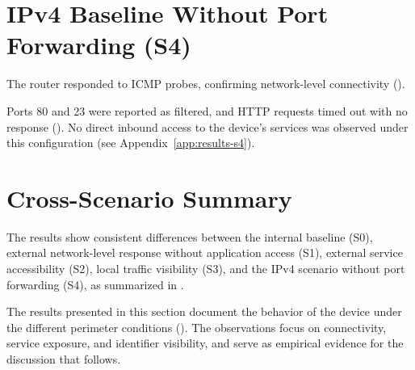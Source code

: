 \section{IPv4 Baseline Without Port Forwarding (S4)}\label{sec:results-s4}
The router responded to ICMP probes, confirming network-level connectivity ().

Ports 80 and 23 were reported as filtered, and HTTP requests timed out with no response (). No direct inbound access to the device’s services was observed under this configuration (see Appendix~\ref{app:results-s4}).

\section{Cross-Scenario Summary}\label{sec:results-summary}
The results show consistent differences between the internal baseline (S0), external network-level response without application access (S1), external service accessibility (S2), local traffic visibility (S3), and the IPv4 scenario without port forwarding (S4), as summarized in .

The results presented in this section document the behavior of the device under the different perimeter conditions (). The observations focus on connectivity, service exposure, and identifier visibility, and serve as empirical evidence for the discussion that follows.


